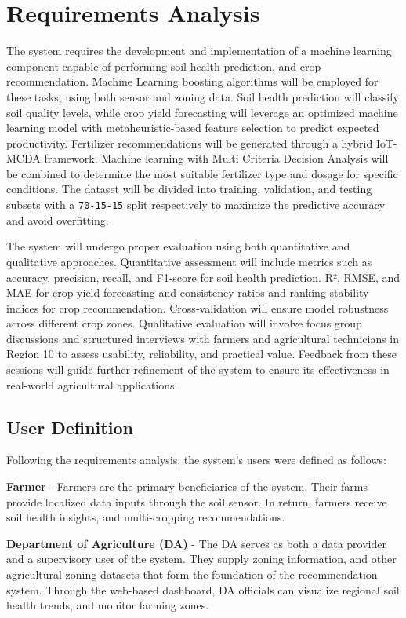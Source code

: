 {	\section{Requirements Analysis}
	The system requires the development and implementation of a machine learning component capable of performing soil health prediction, and  crop recommendation. Machine Learning boosting algorithms will be employed for these tasks, using both sensor and zoning data. Soil health prediction will classify soil quality levels, while crop yield forecasting will leverage an optimized machine learning model with metaheuristic-based feature selection to predict expected productivity. Fertilizer recommendations will be generated through a hybrid IoT-MCDA framework. Machine learning with Multi Criteria Decision Analysis will be combined to determine the most suitable fertilizer type and dosage for specific conditions. The dataset will be divided into training, validation, and testing subsets with a \texttt{70-15-15} split respectively to maximize the predictive accuracy and avoid overfitting.
	
	The system will undergo proper evaluation using both quantitative and qualitative approaches. Quantitative assessment will include metrics such as accuracy, precision, recall, and F1-score for soil health prediction. R², RMSE, and MAE for crop yield forecasting and consistency ratios and ranking stability indices for crop recommendation. Cross-validation will ensure model robustness across different crop zones. Qualitative evaluation will involve focus group discussions and structured interviews with farmers and agricultural technicians in Region 10 to assess usability, reliability, and practical value. Feedback from these sessions will guide further refinement of the system to ensure its effectiveness in real-world agricultural applications.
	
	\subsection{User Definition}
	Following the requirements analysis, the system’s users were defined as follows:
	
	\textbf{Farmer} - Farmers are the primary beneficiaries of the system. Their farms provide localized data inputs through the soil sensor. In return, farmers receive soil health insights, and multi-cropping recommendations. 
	
	\textbf{Department of Agriculture (DA)} - The DA serves as both a data provider and a supervisory user of the system. They supply zoning information, and other agricultural zoning datasets that form the foundation of the recommendation system. Through the web-based dashboard, DA officials can visualize regional soil health trends, and monitor farming zones.
	
}
